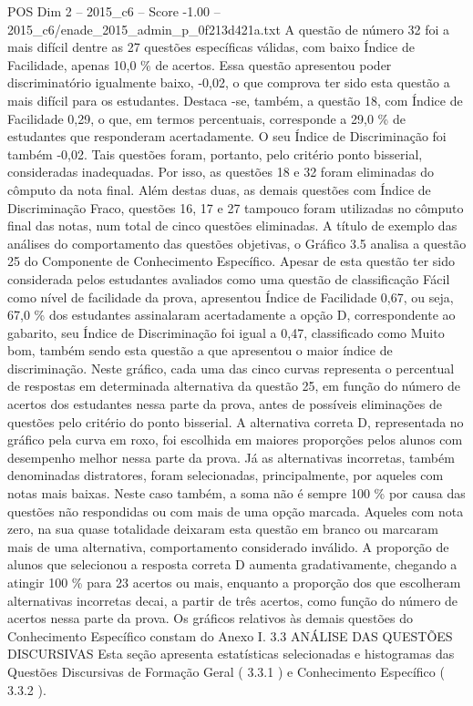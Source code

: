 \begin{textsample}{POS Dim 2 – 2015\_c6 – Score -1.00 – 2015\_c6/enade\_2015\_admin\_p\_0f213d421a.txt}
A questão de número 32 foi a mais difícil dentre as 27 questões específicas válidas, com baixo Índice de Facilidade, apenas 10,0 \% de acertos.
Essa questão apresentou poder discriminatório igualmente baixo, -0,02, o que comprova ter sido esta questão a mais difícil para os estudantes.
Destaca -se, também, a questão 18, com Índice de Facilidade 0,29, o que, em termos percentuais, corresponde a 29,0 \% de estudantes que responderam acertadamente.
O seu Índice de Discriminação foi também -0,02.
Tais questões foram, portanto, pelo critério ponto bisserial, consideradas inadequadas.
Por isso, as questões 18 e 32 foram eliminadas do cômputo da nota final.
Além destas duas, as demais questões com Índice de Discriminação Fraco, questões 16, 17 e 27 tampouco foram utilizadas no cômputo final das notas, num total de cinco questões eliminadas.
A título de exemplo das análises do comportamento das questões objetivas, o Gráfico 3.5 analisa a questão 25 do Componente de Conhecimento Específico.
Apesar de esta questão ter sido considerada pelos estudantes avaliados como uma questão de classificação Fácil como nível de facilidade da prova, apresentou Índice de Facilidade 0,67, ou seja, 67,0 \% dos estudantes assinalaram acertadamente a opção D, correspondente ao gabarito, seu Índice de Discriminação foi igual a 0,47, classificado como Muito bom, também sendo esta questão a que apresentou o maior índice de discriminação.
Neste gráfico, cada uma das cinco curvas representa o percentual de respostas em determinada alternativa da questão 25, em função do número de acertos dos estudantes nessa parte da prova, antes de possíveis eliminações de questões pelo critério do ponto bisserial.
A alternativa correta D, representada no gráfico pela curva em roxo, foi escolhida em maiores proporções pelos alunos com desempenho melhor nessa parte da prova.
Já as alternativas incorretas, também denominadas distratores, foram selecionadas, principalmente, por aqueles com notas mais baixas.
Neste caso também, a soma não é sempre 100 \% por causa das questões não respondidas ou com mais de uma opção marcada.
Aqueles com nota zero, na sua quase totalidade deixaram esta questão em branco ou marcaram mais de uma alternativa, comportamento considerado inválido.
A proporção de alunos que selecionou a resposta correta D aumenta gradativamente, chegando a atingir 100 \% para 23 acertos ou mais, enquanto a proporção dos que escolheram alternativas incorretas decai, a partir de três acertos, como função do número de acertos nessa parte da prova.
Os gráficos relativos às demais questões do Conhecimento Específico constam do Anexo I. 3.3 ANÁLISE DAS QUESTÕES DISCURSIVAS Esta seção apresenta estatísticas selecionadas e histogramas das Questões Discursivas de Formação Geral ( 3.3.1 ) e Conhecimento Específico ( 3.3.2 ).

\end{textsample}
